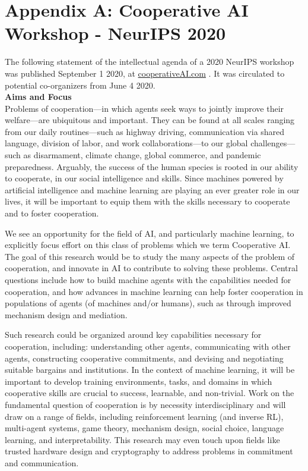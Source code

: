 \documentclass[11pt, a4paper, logo, onecolumn, nonumbering]{deepmind}
\begin{document}
  
 \pagebreak
 
\section{Appendix A: Cooperative AI Workshop - NeurIPS 2020}
\label{section:appendixA}

The following statement of the intellectual agenda of a 2020 NeurIPS workshop was published September 1 2020, at \href{http://www.cooperativeAI.com}{cooperativeAI.com}%
. It was circulated to potential co-organizers from June 4 2020. \\


\textbf{Aims and Focus}\\
Problems of cooperation—in which agents seek ways to jointly improve their welfare—are ubiquitous and important. They can be found at all scales ranging from our daily routines—such as highway driving, communication via shared language, division of labor, and work collaborations—to our global challenges—such as disarmament, climate change, global commerce, and pandemic preparedness. Arguably, the success of the human species is rooted in our ability to cooperate, in our social intelligence and skills. Since machines powered by artificial intelligence and machine learning are playing an ever greater role in our lives, it will be important to equip them with the skills necessary to cooperate and to foster cooperation.


We see an opportunity for the field of AI, and particularly machine learning, to explicitly focus effort on this class of problems which we term Cooperative AI. The goal of this research would be to study the many aspects of the problem of cooperation, and innovate in AI to contribute to solving these problems. Central questions include how to build machine agents with the capabilities needed for cooperation, and how advances in machine learning can help foster cooperation in populations of agents (of machines and/or humans), such as through improved mechanism design and mediation.



Such research could be organized around key capabilities necessary for cooperation, including: understanding other agents, communicating with other agents, constructing cooperative commitments, and devising and negotiating suitable bargains and institutions. In the context of machine learning, it will be important to develop training environments, tasks, and domains in which cooperative skills are crucial to success, learnable, and non-trivial. Work on the fundamental question of cooperation is by necessity interdisciplinary and will draw on a range of fields, including reinforcement learning (and inverse RL), multi-agent systems, game theory, mechanism design, social choice, language learning, and interpretability. This research may even touch upon fields like trusted hardware design and cryptography to address problems in commitment and communication.
\end{document}
